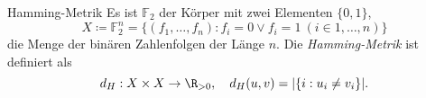 \begin{example}{Hamming-Metrik}
  Es ist $ \mathbb{F}_2 $ der Körper mit zwei Elementen $ \{ 0, 1 \} $,
  \begin{equation*}
    X \coloneqq \mathbb{F}_2^n = \{ (f_1, \dots, f_n) : f_i = 0 \vee f_i = 1 \ (i \in {1, \dots, n}) \}
  \end{equation*}
  die Menge der binären Zahlenfolgen der Länge $ n $. Die \emph{Hamming-Metrik} ist definiert als
  \begin{equation*}
    d_H: X \times X \to \R_{>0}, \quad d_H(u,v) = |\{ i : u_i \neq v_i \}|\text{.}
  \end{equation*}
\end{example}